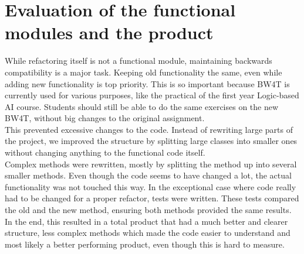 \section{Evaluation of the functional modules and the product}
While refactoring itself is not a functional module, maintaining backwards compatibility is a major task. Keeping old functionality the same, even while adding new functionality is top priority. This is so important because BW4T is currently used for various purposes, like the practical of the first year Logic-based AI course. Students should still be able to do the same exercises on the new BW4T, without big changes to the original assignment.\\

This prevented excessive changes to the code. Instead of rewriting large parts of the project, we improved the structure by splitting large classes into smaller ones without changing anything to the functional code itself.  \\

Complex methods were rewritten, mostly by splitting the method up into several smaller methods. Even though the code seems to have changed a lot, the actual functionality was not touched this way. In the exceptional case where code really had to be changed for a proper refactor, tests were written. These tests compared the old and the new method, ensuring both methods provided the same results.\\

In the end, this resulted in a total product that had a much better and clearer structure, less complex methods which made the code easier to understand and most likely a better performing product, even though this is hard to measure. 